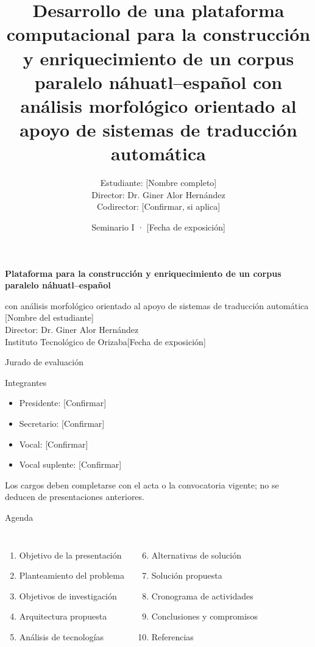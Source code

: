 \documentclass[aspectratio=169,10pt]{beamer}
\title{Desarrollo de una plataforma computacional para la construcción y enriquecimiento de un corpus paralelo náhuatl--español con análisis morfológico orientado al apoyo de sistemas de traducción automática}
\author{Estudiante: [Nombre completo]\\Director: Dr. Giner Alor Hernández\\Codirector: [Confirmar, si aplica]}
\institute{Maestría en Sistemas Computacionales\\Instituto Tecnológico de Orizaba}
\date{Seminario I · [Fecha de exposición]}
\begin{document}
\begin{frame}[plain]
\vspace{.35cm}
{\Large\bfseries\color{NahuaDark}Plataforma para la construcción y enriquecimiento de un corpus paralelo náhuatl--español}\par\vspace{.28cm}
{\normalsize con análisis morfológico orientado al apoyo de sistemas de traducción automática}\vspace{.65cm}
{\small [Nombre del estudiante]\\Director: Dr. Giner Alor Hernández\\Instituto Tecnológico de Orizaba}\vfill{\scriptsize\color{NahuaGray}[Fecha de exposición]}
\end{frame}
\begin{frame}{Jurado de evaluación}
\begin{block}{Integrantes}\vspace{.1cm}
\begin{itemize}\item Presidente: [Confirmar]\item Secretario: [Confirmar]\item Vocal: [Confirmar]\item Vocal suplente: [Confirmar]\end{itemize}
\end{block}
\small Los cargos deben completarse con el acta o la convocatoria vigente; no se deducen de presentaciones anteriores.
\end{frame}
\begin{frame}{Agenda}
\begin{columns}[T]\begin{enumerate}\item Objetivo de la presentación\item Planteamiento del problema\item Objetivos de investigación\item Arquitectura propuesta\item Análisis de tecnologías\end{enumerate}
\begin{enumerate}\setcounter{enumi}{5}\item Alternativas de solución\item Solución propuesta\item Cronograma de actividades\item Conclusiones y compromisos\item Referencias\end{enumerate}\end{columns}
\end{frame}
\end{document}
